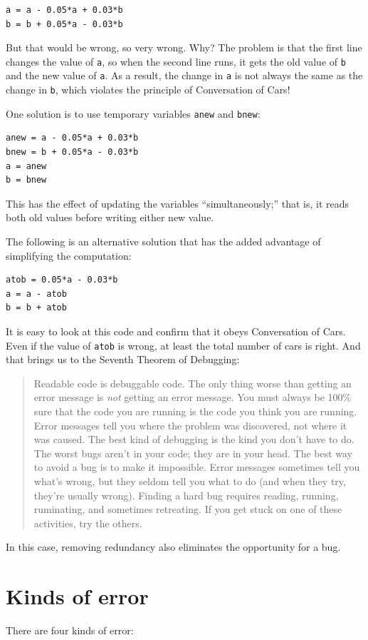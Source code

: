 \documentclass[
]{book}
\newcommand{\displaythrm}[1]{%
    \ifthenelse{\equal{#1}{1}}%
        {Readable code is debuggable code.}{%
    \ifthenelse{\equal{#1}{2}}%
        {The only thing worse than getting an error message is {\em
         not} getting an error message.}{%
    \ifthenelse{\equal{#1}{3}}%
        {You must always be 100\% sure that the code you are running
         is the code you think you are running.}{%
    \ifthenelse{\equal{#1}{4}}%
        {Error messages tell you where the problem was discovered,
         not where it was caused.}{%
    \ifthenelse{\equal{#1}{5}}%
        {The best kind of debugging is the kind you don't have to do.}{%
    \ifthenelse{\equal{#1}{6}}%
        {The worst bugs aren't in your code; they are in your head.}{%
    \ifthenelse{\equal{#1}{7}}%
        {The best way to avoid a bug is to make it impossible.}{%
    \ifthenelse{\equal{#1}{8}}%
        {Error messages sometimes tell you what's wrong, but they
         seldom tell you what to do (and when they try, they're usually
         wrong).}{%
    \ifthenelse{\equal{#1}{9}}%
        {Finding a hard bug requires reading, running, ruminating,
         and sometimes retreating.  If you get stuck on one of these
         activities, try the others.}{%
    {}%
}}}}}}}}}}%
\begin{document}
\begin{verbatim}
a = a - 0.05*a + 0.03*b
b = b + 0.05*a - 0.03*b
\end{verbatim}

But that would be wrong, so very wrong.  Why?  The problem is that
the first line changes the value of {\tt a}, so when the second line
runs, it gets the old value of {\tt b} and the new value of {\tt a}.
As a result, the change in {\tt a} is not always the same as the
change in {\tt b}, which violates the principle of Conversation
of Cars!

One solution is to use temporary variables {\tt anew} and {\tt bnew}:

\begin{verbatim}
anew = a - 0.05*a + 0.03*b
bnew = b + 0.05*a - 0.03*b
a = anew
b = bnew
\end{verbatim}

This has the effect of updating the variables ``simultaneously;'' that
is, it reads both old values before writing either new value.

The following is an alternative solution that
has the added advantage of simplifying the computation:

\begin{verbatim}
atob = 0.05*a - 0.03*b
a = a - atob
b = b + atob
\end{verbatim}

It is easy to look at this code and confirm that it obeys Conversation
of Cars.  Even if the value of {\tt atob} is wrong, at least the total
number of cars is right.  And that brings us to the Seventh Theorem of
Debugging:

\begin{quote}
\displaythrm{7}
\end{quote}

In this case, removing redundancy also eliminates the opportunity for
a bug.


\section{Kinds of error}

There are four kinds of error:
\end{document}
